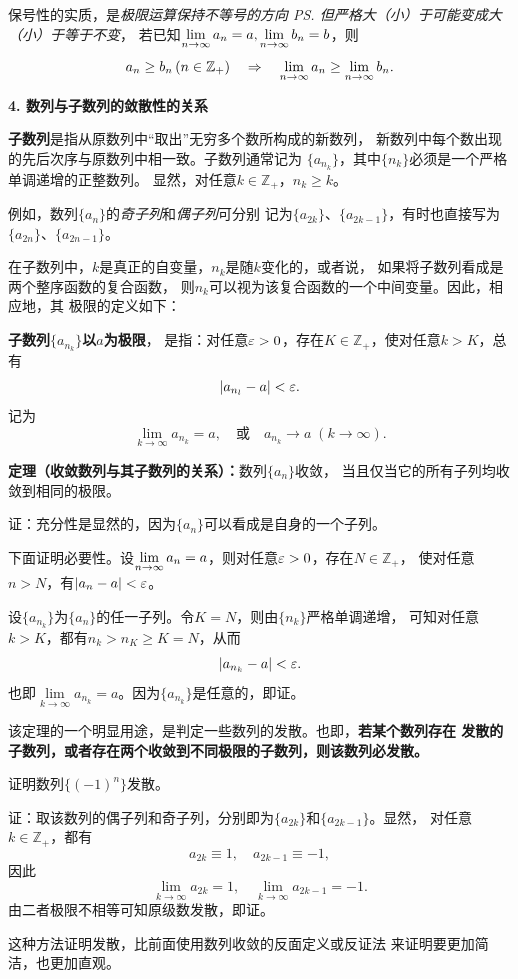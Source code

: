 保号性的实质，是{\it 极限运算保持不等号的方向
\ps{但严格大（小）于可能变成大（小）于等于}不变}，
若已知$\lim\limits_{n\to\infty} a_n=a,\lim\limits_{n\to\infty} b_n=b$，则
$$a_n\geq b_n\,(n\in\mathbb{Z}_+)\quad\Rightarrow
\quad\lim\limits_{n\to\infty} a_n\geq\lim\limits_{n\to\infty} b_n.$$

\bs
{\bf 4. 数列与子数列的敛散性的关系}

{\bf 子数列}是指从原数列中“取出”无穷多个数所构成的新数列，
新数列中每个数出现的先后次序与原数列中相一致。子数列通常记为
$\{a_{n_k}\}$，其中$\{n_k\}$必须是一个严格单调递增的正整数列。
显然，对任意$k\in\mathbb{Z}_+$，$n_k\geq k$。

例如，数列$\{a_n\}$的{\it 奇子列}和{\it 偶子列}可分别
记为$\{a_{2k}\}$、$\{a_{2k-1}\}$，有时也直接写为
$\{a_{2n}\}$、$\{a_{2n-1}\}$。

在子数列中，$k$是真正的自变量，$n_k$是随$k$变化的，或者说，
如果将子数列看成是两个整序函数的复合函数，
则$n_k$可以视为该复合函数的一个中间变量。因此，相应地，其
极限的定义如下：

{\bf 子数列$\{a_{n_k}\}$以$a$为极限}，
是指：对任意$\varepsilon>0$，存在$K\in\mathbb{Z}_+$，使对任意$k>K$，总有
$$|a_{n_l}-a|<\varepsilon.$$
记为
$$\lim\limits_{k\to\infty}a_{n_k}=a,\quad 
\mbox{或}\quad a_{n_k}\to a\;{(k\to\infty)}.$$

\begin{thx}
	{\bf 定理（收敛数列与其子数列的关系）：}数列$\{a_n\}$收敛，
	当且仅当它的所有子列均收敛到相同的极限。
\end{thx}

证：充分性是显然的，因为$\{a_n\}$可以看成是自身的一个子列。

下面证明必要性。设$\lim\limits_{n\to\infty} a_n=a$，则对任意$\varepsilon>0$，存在$N\in\mathbb{Z}_+$，
使对任意$n>N$，有$|a_n-a|<\varepsilon$。

设$\{a_{n_k}\}$为$\{a_n\}$的任一子列。令$K=N$，则由$\{n_k\}$严格单调递增，
可知对任意$k>K$，都有$n_k>n_K\geq K=N$，从而 
$$|a_{n_k}-a|<\varepsilon.$$
也即$\lim\limits_{k\to\infty}a_{n_k}=a$。因为$\{a_{n_k}\}$是任意的，即证。
\fin

\bs
该定理的一个明显用途，是判定一些数列的发散。也即，{\bf 若某个数列存在
发散的子数列，或者存在两个收敛到不同极限的子数列，则该数列必发散。}

\egz 证明数列$\{(-1)^n\}$发散。

证：取该数列的偶子列和奇子列，分别即为$\{a_{2k}\}$和$\{a_{2k-1}\}$。显然，
对任意$k\in\mathbb{Z}_+$，都有
$$a_{2k}\equiv 1,\quad a_{2k-1}\equiv -1,$$
因此
$$\lim\limits_{k\to\infty}a_{2k}=1,\quad
\lim\limits_{k\to\infty}a_{2k-1}=-1.$$
由二者极限不相等可知原级数发散，即证。\fin

这种方法证明发散，比前面使用数列收敛的反面定义或反证法
来证明要更加简洁，也更加直观。

